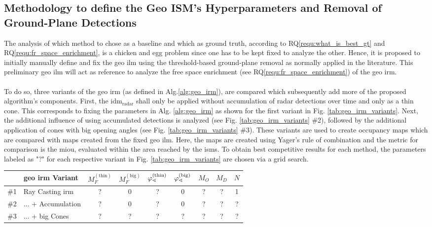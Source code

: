 \subsection{Methodology to define the Geo ISM's Hyperparameters and Removal of Ground-Plane Detections}
\label{subsec:method_choice_of_gt}
The analysis of which method to chose as a baseline and which as ground truth, according to RQ\ref{requ:what_is_best_gt} and RQ\ref{requ:fr_space_enrichment}, is a chicken and egg problem since one has to be kept fixed to analyze the other. Hence, it is proposed to initially manually define and fix the geo \gls{ilm} using the threshold-based ground-plane removal as normally applied in the literature. This preliminary geo \gls{ilm} will act as reference to analyze the free space enrichment (see RQ\ref{requ:fr_space_enrichment}) of the geo \gls{irm}. 
\\\\
To do so, three variants of the geo \gls{irm} (as defined in Alg.\ref{alg:geo_irm}), are compared which subsequently add more of the proposed algorithm's components. First, the \gls{idm}$_\text{radar}$ shall only be applied without accumulation of radar detections over time and only as a thin cone. This corresponds to fixing the parameters in Alg. \ref{alg:geo_irm} as shown for the first variant in Fig. \ref{tab:geo_irm_variants}. Next, the additional influence of using accumulated detections is analyzed (see Fig. \ref{tab:geo_irm_variants} \#2), followed by the additional application of cones with big opening angles (see Fig. \ref{tab:geo_irm_variants} \#3). These variants are used to create occupancy maps which are compared with maps created from the fixed geo \gls{ilm}. Here, the maps are created using Yager's rule of combination and the metric for comparison is the m\gls{iou}, evaluated within the area reached by the \gls{ism}s. To obtain best competitive results for each method, the parameters labeled as "?" for each respective variant in Fig. \ref{tab:geo_irm_variants} are chosen via a grid search.
\begin{center}
	\begin{tabular}{cl|c|c|c|c|c|c|c}
		& geo \gls{irm} Variant & $M_F^{(\text{thin})}$ & $M_F^{(\text{big})}$ & $\varphi_\sphericalangle^{(\text{\scriptsize thin})}$ & $\varphi_\sphericalangle^{(\text{\scriptsize big})}$ & $M_O$ & $M_D$ & $N$ \\
		\hline
		\#1 &Ray Casting \gls{irm}& ? & \textcolor{myred}{0} & ? & \textcolor{myred}{0} & ? & ? & \textcolor{myred}{1} \\
		\#2 &... + Accumulation & ? & \textcolor{myred}{0} & ? & \textcolor{myred}{0} & ? & ? & ? \\
		\#3 &... + big Cones & ? & ? & ? & ? & ? & ? & ?
	\end{tabular}
\end{center} 
